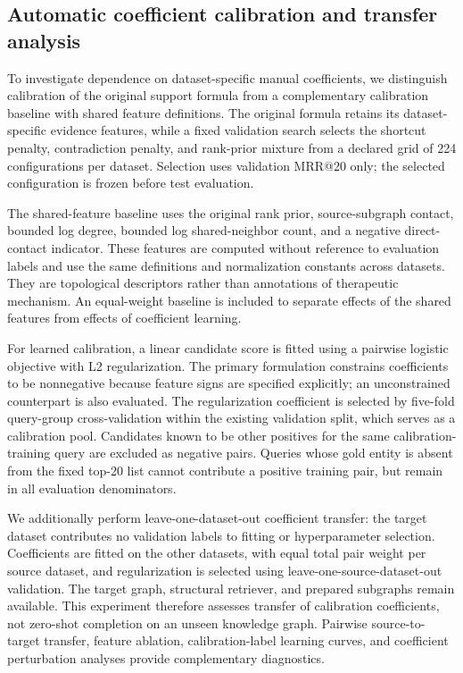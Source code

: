 \subsection{Automatic coefficient calibration and transfer analysis}

To investigate dependence on dataset-specific manual coefficients, we distinguish
calibration of the original support formula from a complementary calibration
baseline with shared feature definitions. The original formula retains its
dataset-specific evidence features, while a fixed validation search selects the
shortcut penalty, contradiction penalty, and rank-prior mixture from a declared
grid of 224 configurations per dataset. Selection uses validation MRR@20 only;
the selected configuration is frozen before test evaluation.

The shared-feature baseline uses the original rank prior, source-subgraph contact,
bounded log degree, bounded log shared-neighbor count, and a negative direct-contact
indicator. These features are computed without reference to evaluation labels and
use the same definitions and normalization constants across datasets. They are
topological descriptors rather than annotations of therapeutic mechanism. An
equal-weight baseline is included to separate effects of the shared features from
effects of coefficient learning.

For learned calibration, a linear candidate score is fitted using a pairwise
logistic objective with L2 regularization. The primary formulation constrains
coefficients to be nonnegative because feature signs are specified explicitly;
an unconstrained counterpart is also evaluated. The regularization coefficient
is selected by five-fold query-group cross-validation within the existing
validation split, which serves as a calibration pool. Candidates known to be
other positives for the same calibration-training query are excluded as negative
pairs. Queries whose gold entity is absent from the fixed top-20 list cannot
contribute a positive training pair, but remain in all evaluation denominators.

We additionally perform leave-one-dataset-out coefficient transfer: the target
dataset contributes no validation labels to fitting or hyperparameter selection.
Coefficients are fitted on the other datasets, with equal total pair weight per
source dataset, and regularization is selected using leave-one-source-dataset-out
validation. The target graph, structural retriever, and prepared subgraphs remain
available. This experiment therefore assesses transfer of calibration coefficients,
not zero-shot completion on an unseen knowledge graph. Pairwise source-to-target
transfer, feature ablation, calibration-label learning curves, and coefficient
perturbation analyses provide complementary diagnostics.

